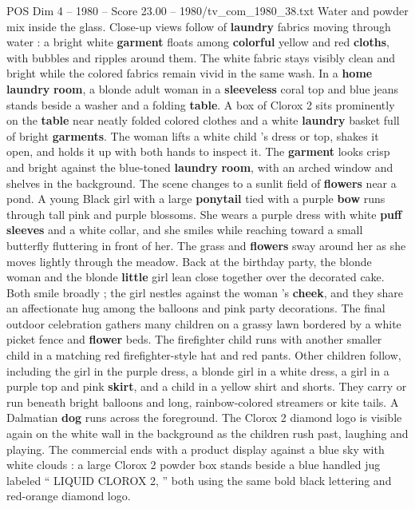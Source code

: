 \begin{textsample}{POS Dim 4 – 1980 – Score 23.00 – 1980/tv\_com\_1980\_38.txt}
Water and powder mix inside the glass.
Close-up views follow of \textbf{laundry} fabrics moving through water : a bright white \textbf{garment} floats among \textbf{colorful} yellow and red \textbf{cloths}, with bubbles and ripples around them.
The white fabric stays visibly clean and bright while the colored fabrics remain vivid in the same wash.
In a \textbf{home} \textbf{laundry} \textbf{room}, a blonde adult woman in a \textbf{sleeveless} coral top and blue jeans stands beside a washer and a folding \textbf{table}.
A box of Clorox 2 sits prominently on the \textbf{table} near neatly folded colored clothes and a white \textbf{laundry} basket full of bright \textbf{garments}.
The woman lifts a white child ’s dress or top, shakes it open, and holds it up with both hands to inspect it.
The \textbf{garment} looks crisp and bright against the blue-toned \textbf{laundry} \textbf{room}, with an arched window and shelves in the background.
The scene changes to a sunlit field of \textbf{flowers} near a pond.
A young Black girl with a large \textbf{ponytail} tied with a purple \textbf{bow} runs through tall pink and purple blossoms.
She wears a purple dress with white \textbf{puff} \textbf{sleeves} and a white collar, and she smiles while reaching toward a small butterfly fluttering in front of her.
The grass and \textbf{flowers} sway around her as she moves lightly through the meadow.
Back at the birthday party, the blonde woman and the blonde \textbf{little} girl lean close together over the decorated cake.
Both smile broadly ; the girl nestles against the woman ’s \textbf{cheek}, and they share an affectionate hug among the balloons and pink party decorations.
The final outdoor celebration gathers many children on a grassy lawn bordered by a white picket fence and \textbf{flower} beds.
The firefighter child runs with another smaller child in a matching red firefighter-style hat and red pants.
Other children follow, including the girl in the purple dress, a blonde girl in a white dress, a girl in a purple top and pink \textbf{skirt}, and a child in a yellow shirt and shorts.
They carry or run beneath bright balloons and long, rainbow-colored streamers or kite tails.
A Dalmatian \textbf{dog} runs across the foreground.
The Clorox 2 diamond logo is visible again on the white wall in the background as the children rush past, laughing and playing.
The commercial ends with a product display against a blue sky with white clouds : a large Clorox 2 powder box stands beside a blue handled jug labeled “ LIQUID CLOROX 2, ” both using the same bold black lettering and red-orange diamond logo.

\end{textsample}
